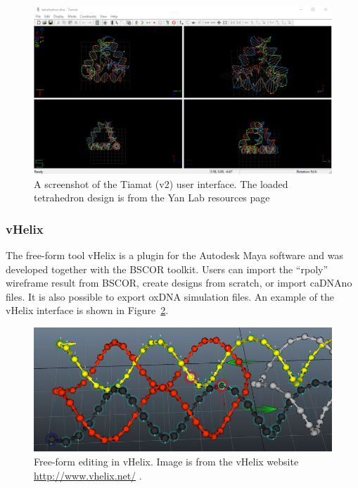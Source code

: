 \begin{figure}[h]
  \begin{center}
    \includegraphics[width=\textwidth]{figures/tiamat_ui.png}
    \caption{A screenshot of the Tiamat \cite{Tiamat} (v2) user interface. The loaded tetrahedron design is from the Yan Lab resources page \cite{tiamatWeb}}
    \label{fig:tiamat}
  \end{center}
\end{figure}

\subsubsection{vHelix}
\label{sec:vhelix}
The free-form tool vHelix \cite{vHelix} is a plugin for the Autodesk Maya software and was developed together with the BSCOR toolkit. Users can import the ``rpoly'' wireframe result from BSCOR, create designs from scratch, or import caDNAno files. It is also possible to export oxDNA simulation files. An example of the vHelix interface is shown in Figure~\ref{fig:vhelix}. 

\begin{figure}[h]
  \begin{center}
    \includegraphics[width=\textwidth]{figures/vhelix.jpg}
    \caption{Free-form editing in vHelix. Image is from the vHelix website \url{http://www.vhelix.net/} \cite{vHelixWeb}.}
    \label{fig:vhelix}
  \end{center}
\end{figure}


